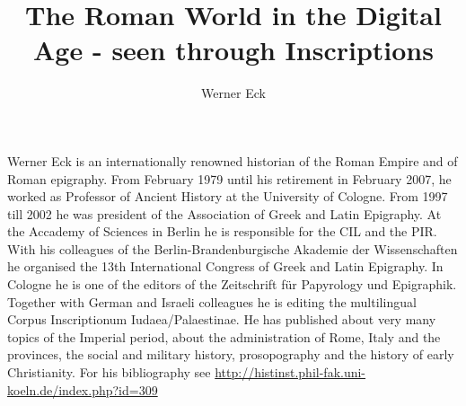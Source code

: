 \documentclass[amsthm,ebook]{saparticle}
\title{The Roman World in the Digital Age - seen through Inscriptions}
\author[]{Werner Eck\corref{first}}
\begin{document}
\maketitle

Werner Eck is an internationally renowned historian of the Roman Empire and of Roman epigraphy. From February 1979 until his retirement in February 2007, he worked as Professor of Ancient History at the University of Cologne. From 1997 till 2002 he was president of the Association of Greek and Latin Epigraphy. At the Accademy of Sciences in Berlin he is responsible for the CIL and the PIR. With his colleagues of the Berlin-Brandenburgische Akademie der Wissenschaften he organised the 13th International Congress of Greek and Latin Epigraphy. In Cologne he is one of the editors of the Zeitschrift für Papyrology und Epigraphik. Together with German and Israeli colleagues he is editing the multilingual Corpus Inscriptionum Iudaea/Palaestinae. He has published about very many topics of the Imperial period, about the administration of Rome, Italy and the provinces, the social and military history, prosopography and the history of early Christianity. For his bibliography see \url{http://histinst.phil-fak.uni-koeln.de/index.php?id=309}
\end{document}
